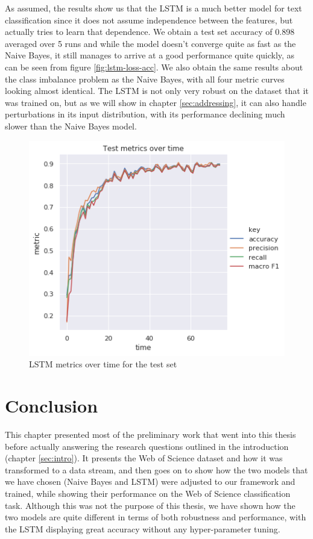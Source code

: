 \documentclass[12pt]{extreport}
\begin{document}
As assumed, the results show us that the LSTM is a much better model for text classification since it does not assume independence between the features, but actually tries to learn that dependence. We obtain a test set accuracy of 0.898 averaged over 5 runs and while the model doesn't converge quite as fast as the Naive Bayes, it still manages to arrive at a good performance quite quickly, as can be seen from figure \ref{fig:lstm-loss-acc}. We also obtain the same results about the class imbalance problem as the Naive Bayes, with all four metric curves looking almost identical. The LSTM is not only very robust on the dataset that it was trained on, but as we will show in chapter \ref{sec:addressing}, it can also handle perturbations in its input distribution, with its performance declining much slower than the Naive Bayes model.

\begin{figure}[H]
\centering
\includegraphics[width=0.8\linewidth]{assets/framework/lstm_BERT_test_metrics_holdout.png}
\caption{LSTM metrics over time for the test set}
\label{fig:lstm-metrics}
\end{figure}

\section{Conclusion}

This chapter presented most of the preliminary work that went into this thesis before actually answering the research questions outlined in the introduction (chapter \ref{sec:intro}). It presents the Web of Science dataset and how it was transformed to a data stream, and then goes on to show how the two models that we have chosen (Naive Bayes and LSTM) were adjusted to our framework and trained, while showing their performance on the Web of Science classification task. Although this was not the purpose of this thesis, we have shown how the two models are quite different in terms of both robustness and performance, with the LSTM displaying great accuracy without any hyper-parameter tuning.
\end{document}
